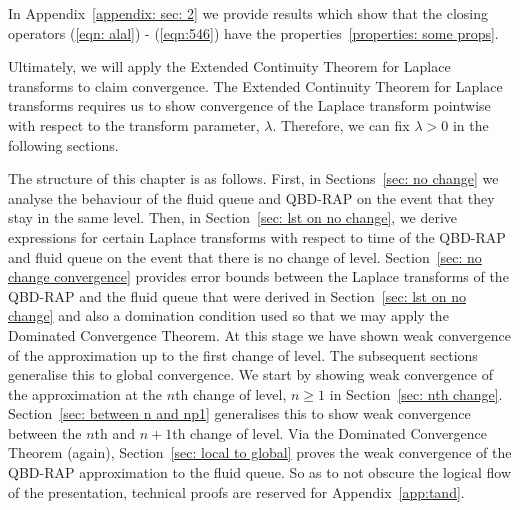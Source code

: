 In Appendix~\ref{appendix: sec: 2} we provide results which show that the closing operators (\ref{eqn: alal}) - (\ref{eqn:546}) have the properties~\ref{properties: some props}. 

Ultimately, we will apply the Extended Continuity Theorem for Laplace transforms \cite[Chapter XIII, Theorem 2a]{feller1957} to claim convergence. The Extended Continuity Theorem for Laplace transforms requires us to show convergence of the Laplace transform pointwise with respect to the transform parameter, \(\lambda\). Therefore, we can fix \(\lambda>0\) in the following sections. 

The structure of this chapter is as follows. First, in Sections~\ref{sec: no change} we analyse the behaviour of the fluid queue and QBD-RAP on the event that they stay in the same level. Then, in Section~\ref{sec: lst on no change}, we derive expressions for certain Laplace transforms with respect to time of the QBD-RAP and fluid queue on the event that there is no change of level. Section~\ref{sec: no change convergence} provides error bounds between the Laplace transforms of the QBD-RAP and the fluid queue that were derived in Section~\ref{sec: lst on no change} and also a domination condition used so that we may apply the Dominated Convergence Theorem. At this stage we have shown weak convergence of the approximation up to the first change of level. The subsequent sections generalise this to global convergence. We start by showing weak convergence of the approximation at the \(n\)th change of level, \(n\geq 1\) in Section~\ref{sec: nth change}. Section~\ref{sec: between n and np1} generalises this to show weak convergence between the \(n\)th and \(n+1\)th change of level. Via the Dominated Convergence Theorem (again), Section~\ref{sec: local to global} proves the weak convergence of the QBD-RAP approximation to the fluid queue. So as to not obscure the logical flow of the presentation, technical proofs are reserved for Appendix~\ref{app:tand}.

